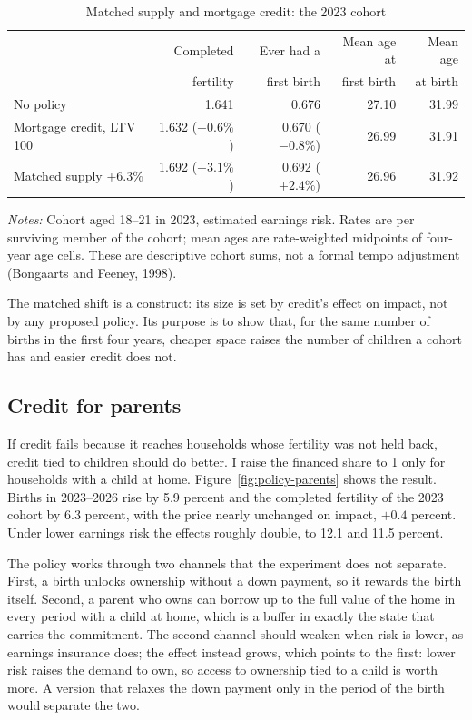 \begin{table}[t]
\centering
\caption{Matched supply and mortgage credit: the 2023 cohort}
\label{tab:policy-tempo}
\small
\begin{tabularx}{\textwidth}{@{}Xrrrr@{}}
\toprule
 & Completed & Ever had a & Mean age at & Mean age \\
 & fertility & first birth & first birth & at birth \\
\midrule
No policy & 1.641 & 0.676 & 27.10 & 31.99 \\
Mortgage credit, LTV 100 & 1.632 ($-0.6\%$) & 0.670 ($-0.8\%$) & 26.99 & 31.91 \\
Matched supply $+6.3\%$ & 1.692 ($+3.1\%$) & 0.692 ($+2.4\%$) & 26.96 & 31.92 \\
\bottomrule
\end{tabularx}
\par\smallskip
\begin{minipage}{0.95\linewidth}
\footnotesize\textit{Notes:} Cohort aged 18--21 in 2023, estimated earnings
risk. Rates are per surviving member of the cohort; mean ages are
rate-weighted midpoints of four-year age cells. These are descriptive cohort
sums, not a formal tempo adjustment (Bongaarts and Feeney, 1998).
\end{minipage}
\end{table}

The matched shift is a construct: its size is set by credit's effect on
impact, not by any proposed policy. Its purpose is to show that, for the same
number of births in the first four years, cheaper space raises the number of
children a cohort has and easier credit does not.

\subsection{Credit for parents}
\label{sec:policy-parents}

If credit fails because it reaches households whose fertility was not held
back, credit tied to children should do better. I raise the financed share to
1 only for households with a child at home. Figure~\ref{fig:policy-parents}
shows the result. Births in 2023--2026 rise by 5.9 percent and the completed
fertility of the 2023 cohort by 6.3 percent, with the price nearly unchanged
on impact, $+0.4$ percent. Under lower earnings risk the effects roughly
double, to 12.1 and 11.5 percent.

The policy works through two channels that the experiment does not separate.
First, a birth unlocks ownership without a down payment, so it rewards the
birth itself. Second, a parent who owns can borrow up to the full value of the
home in every period with a child at home, which is a buffer in exactly the
state that carries the commitment. The second channel should weaken when risk
is lower, as earnings insurance does; the effect instead grows, which points
to the first: lower risk raises the demand to own, so access to ownership tied
to a child is worth more. A version that relaxes the down payment only in the
period of the birth would separate the two.

